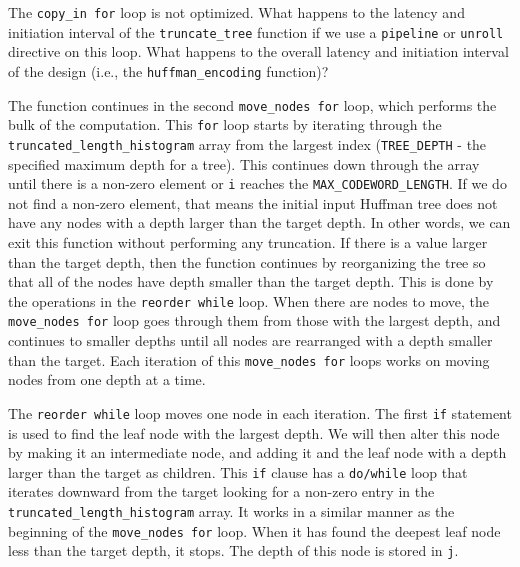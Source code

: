 \begin{exercise}
The \lstinline{copy_in for} loop is not optimized. What happens to the latency and initiation interval of the \lstinline{truncate_tree} function if we use a \lstinline{pipeline} or \lstinline{unroll} directive on this loop. What happens to the overall latency and initiation interval of the design (i.e., the \lstinline{huffman_encoding} function)?
\end{exercise}

The function continues in the second \lstinline{move_nodes for} loop, which performs the bulk of the computation. This \lstinline{for} loop starts by iterating through the \lstinline{truncated_length_histogram} array from the largest index (\lstinline{TREE_DEPTH} - the specified maximum depth for a tree). This continues down through the array until there is a non-zero element or \lstinline{i} reaches the \lstinline{MAX_CODEWORD_LENGTH}. If we do not find a non-zero element, that means the initial input Huffman tree does not have any nodes with a depth larger than the target depth. In other words, we can exit this function without performing any truncation. If there is a value larger than the target depth, then the function continues by reorganizing the tree so that all of the nodes have depth smaller than the target depth. This is done by the operations in the \lstinline{reorder while} loop. When there are nodes to move, the \lstinline{move_nodes for} loop goes through them from those with the largest depth, and continues to smaller depths until all nodes are rearranged with a depth smaller than the target. Each iteration of this \lstinline{move_nodes for} loops works on moving nodes from one depth at a time.

The \lstinline{reorder while} loop moves one node in each iteration. The first \lstinline{if} statement is used to find the leaf node with the largest depth. We will then alter this node by making it an intermediate node, and adding it and the leaf node with a depth larger than the target as children. This \lstinline{if} clause has a \lstinline{do/while} loop that iterates downward from the target looking for a non-zero entry in the \lstinline{truncated_length_histogram} array. It works in a similar manner as the beginning of the \lstinline{move_nodes for} loop. When it has found the deepest leaf node less than the target depth, it stops. The depth of this node is stored in \lstinline{j}.

